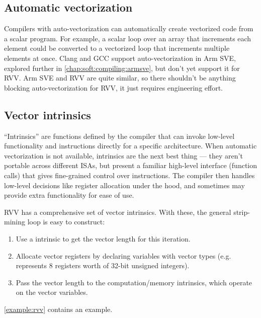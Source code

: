 \documentclass[../thesis]{subfiles}
\begin{document}
\subsection{Automatic vectorization}
Compilers with auto-vectorization can automatically create vectorized code from a scalar program.
For example, a scalar loop over an array that increments each element could be converted to a vectorized loop that increments multiple elements at once.
Clang and GCC support auto-vectorization in Arm SVE, explored further in \cref{chap:soft:compiling:armsve}, but don't yet support it for RVV.
Arm SVE and RVV are quite similar, so there shouldn't be anything blocking auto-vectorization for RVV, it just requires engineering effort.

\subsection{Vector intrinsics}\label{chap:software:subsec:vectorintrinsics}
\enquote{Intrinsics} are functions defined by the compiler that can invoke low-level functionality and instructions directly for a specific architecture.
When automatic vectorization is not available, intrinsics are the next best thing --- they aren't portable across different ISAs, but present a familiar high-level interface (function calls) that gives fine-grained control over instructions.
The compiler then handles low-level decisions like register allocation under the hood, and sometimes may provide extra functionality for ease of use.

RVV has a comprehensive set of vector intrinsics\cite{specification-RVV-intrinsics}.
With these, the general strip-mining loop is easy to construct:
\begin{enumerate}
    \item Use a  intrinsic to get the vector length for this iteration.
    \item Allocate vector registers by declaring variables with vector types (e.g.  represents 8 registers worth of 32-bit unsigned integers).
    \item Pass the vector length to the computation/memory intrinsics, which operate on the vector variables.
\end{enumerate}
\cref{example:rvv} contains an example.
\end{document}
